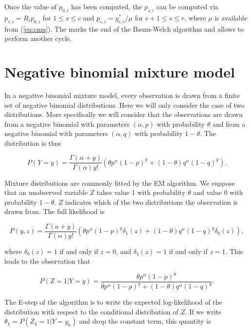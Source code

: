 \documentclass[12pt]{article}
\begin{document}
\begin{appendices}
    Once the value of $p_{0,i}$ has been computed, the
    $p_{s,i}$ can be computed via $p_{s,i} = R_i p_{0,i}$ for
    $1 \leq s \leq c$ and $p_{s,i} = y_{i,s}^* / \mu$ for
    $c+1 \leq s \leq r$,
    where $\mu$ is available from (\ref{eq:cmu}). The marks
    the end of the Baum-Welch algorithm and allows to perform
    another cycle.


  \section{Negative binomial mixture model}
\label{mixture}

    In a negative binomial mixture model, every observation is drawn
    from a finite set of negative binomial distributions. Here we
    will only consider the case of two distributions. More specifically
    we will consider that the observations are drawn from a negative
    binomial with parameters $(\alpha, p)$ with probability $\theta$
    and from a negative binomial with parameters $(\alpha, q)$
    with probability $1-\theta$. The distribution is thus

    \begin{equation}
    P(Y = y) = \frac{\Gamma(\alpha+y)}{\Gamma(\alpha)y!}
    \left(\theta p^{\alpha}(1-p)^y + (1-\theta)q^{\alpha}(1-q)^y\right).
    \end{equation}

    Mixture distributions are commonly fitted by the EM algorithm.
    We suppose that an unobserved variable $Z$ takes value 1 with
    probability $\theta$ and value 0 with probability $1-\theta$.
    $Z$ indicates which of the two distributions the
    observation is drawn from. The full likelihood is 

    \begin{equation*}
    P(y, z) = \frac{\Gamma(a+y)}{\Gamma(\alpha)y!}
    \left(\theta p^{\alpha}(1-p)^y \delta_1(z) + (1-\theta)
    q^{\alpha}(1-q)^y \delta_0(z)\right),
    \end{equation*}

    \noindent
    where $\delta_0(z) = 1$ if and only if $z = 0$, and
    $\delta_1(z) = 1$ if and only if $z = 1$. This leads to the
    observation that

    \begin{equation}
    P(Z=1 | Y=y) = \frac{\theta p^{\alpha}(1-p)^y}
      {\theta p^{\alpha}(1-p)^y + (1-\theta) q^{\alpha}(1-q)^y}.
    \end{equation}

    The E-step of the algorithm is to write the expected log-likelihood
    of the distribution with respect to the conditional distribution
    of $Z$. If we write $\theta_k = P(Z_k=1 | Y=y_k)$ and drop the
    constant term, this quantity is


\end{appendices}
\end{document}
